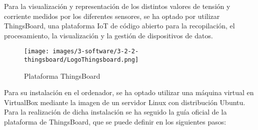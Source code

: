 Para la visualización y representación de los distintos valores de tensión y corriente medidos por los diferentes sensores, se ha optado por utilizar ThingsBoard, una plataforma IoT de código abierto para la recopilación, el procesamiento, la visualización y la gestión de dispositivos de datos.

\begin{figure}[H]
    \centering
    \texttt{[image: images/3-software/3-2-2-thingsboard/LogoThingsboard.png]}
    \caption{Plataforma ThingsBoard}
    \label{fig:3-2-2-ThingsBoard}
\end{figure}

Para su instalación en el ordenador, se ha optado utilizar una máquina virtual en VirtualBox mediante la imagen de un servidor Linux con distribución Ubuntu. Para la realización de dicha instalación se ha seguido la guía oficial de la plataforma de ThingsBoard, que se puede definir en los siguientes pasos: \cite{thingsboardInstallingThingsBoardCE}

